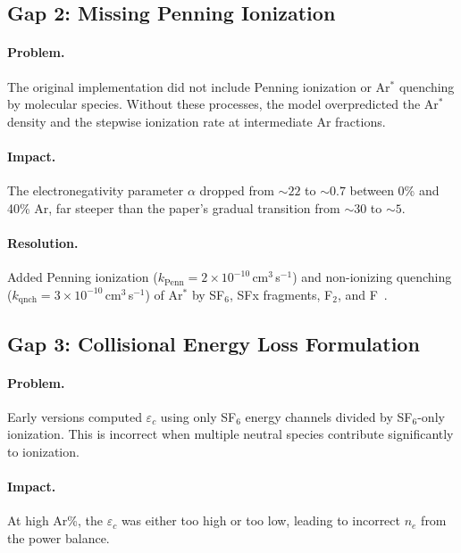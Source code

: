 \documentclass[11pt,a4paper]{report}
\begin{document}
\subsection{Gap 2: Missing Penning Ionization}
\label{sec:gap2}

\paragraph{Problem.} The original implementation did not include Penning ionization or Ar$^*$ quenching by molecular species.  Without these processes, the model overpredicted the Ar$^*$ density and the stepwise ionization rate at intermediate Ar fractions.

\paragraph{Impact.} The electronegativity parameter $\alpha$ dropped from ${\sim}22$ to ${\sim}0.7$ between 0\% and 40\% Ar, far steeper than the paper's gradual transition from ${\sim}30$ to ${\sim}5$.

\paragraph{Resolution.} Added Penning ionization ($k_\mathrm{Penn} = 2 \times 10^{-10}$\,cm$^3$\,s$^{-1}$) and non-ionizing quenching ($k_\mathrm{qnch} = 3 \times 10^{-10}$\,cm$^3$\,s$^{-1}$) of Ar$^*$ by SF$_6$, SFx fragments, F$_2$, and F~\cite{Velazco1978}.

\subsection{Gap 3: Collisional Energy Loss Formulation}
\label{sec:gap3}

\paragraph{Problem.} Early versions computed $\varepsilon_c$ using only SF$_6$ energy channels divided by SF$_6$-only ionization.  This is incorrect when multiple neutral species contribute significantly to ionization.

\paragraph{Impact.} At high Ar\%, the $\varepsilon_c$ was either too high or too low, leading to incorrect $n_e$ from the power balance.
\end{document}

